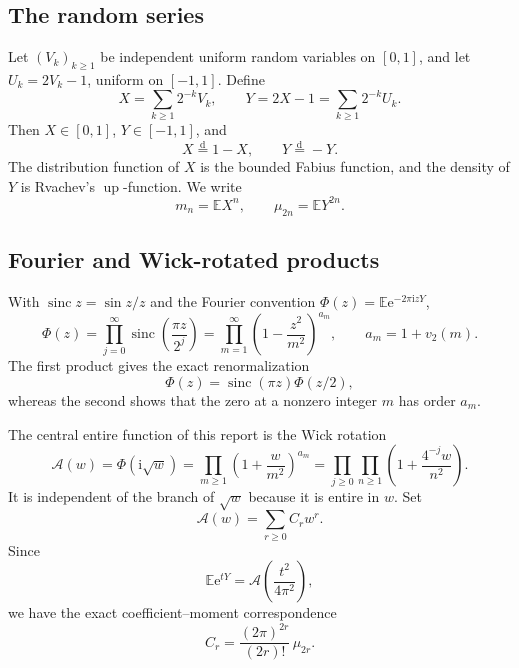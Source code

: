 \documentclass[11pt,oneside]{article}
\theoremstyle{definition}
\theoremstyle{remark}
\newcommand{\Up}{\operatorname{up}}
\newcommand{\sinc}{\operatorname{sinc}}
\newcommand{\e}{\mathrm e}
\newcommand{\ii}{\mathrm i}
\newcommand{\E}{\mathbb E}
\newcommand{\dist}{\mathrel{\stackrel{\mathrm d}=}}
\begin{document}
\subsection{The random series}

Let $(V_k)_{k\ge1}$ be independent uniform random variables on $[0,1]$, and let
$U_k=2V_k-1$, uniform on $[-1,1]$.  Define
\begin{equation}\label{eq:X-Y-def}
 X=\sum_{k\ge1}2^{-k}V_k,\qquad
 Y=2X-1=\sum_{k\ge1}2^{-k}U_k.
\end{equation}
Then $X\in[0,1]$, $Y\in[-1,1]$, and
\begin{equation}\label{eq:symmetry}
 X\dist1-X,\qquad Y\dist-Y.
\end{equation}
The distribution function of $X$ is the bounded Fabius function, and the density
of $Y$ is Rvachev's $\Up$-function.  We write
\begin{equation}\label{eq:moments-def}
 m_n=\E X^n,\qquad \mu_{2n}=\E Y^{2n}.
\end{equation}

\subsection{Fourier and Wick-rotated products}

With $\sinc z=\sin z/z$ and the Fourier convention
$\Phi(z)=\E\e^{-2\pi\ii zY}$,
\begin{equation}\label{eq:Phi-products}
 \Phi(z)=\prod_{j=0}^{\infty}\sinc\!\left(\frac{\pi z}{2^j}\right)
 =\prod_{m=1}^{\infty}\left(1-\frac{z^2}{m^2}\right)^{a_m},
 \qquad a_m=1+v_2(m).
\end{equation}
The first product gives the exact renormalization
\begin{equation}\label{eq:Phi-renorm}
 \Phi(z)=\sinc(\pi z)\Phi(z/2),
\end{equation}
whereas the second shows that the zero at a nonzero integer $m$ has order
$a_m$.

The central entire function of this report is the Wick rotation
\begin{equation}\label{eq:A-def}
 \mathcal A(w)=\Phi(\ii\sqrt w)
 =\prod_{m\ge1}\left(1+\frac{w}{m^2}\right)^{a_m}
 =\prod_{j\ge0}\prod_{n\ge1}\left(1+\frac{4^{-j}w}{n^2}\right).
\end{equation}
It is independent of the branch of $\sqrt w$ because it is entire in $w$.
Set
\begin{equation}\label{eq:C-def}
 \mathcal A(w)=\sum_{r\ge0}C_rw^r.
\end{equation}
Since
\begin{equation}\label{eq:mgf-A}
 \E\e^{tY}=\mathcal A\!\left(\frac{t^2}{4\pi^2}\right),
\end{equation}
we have the exact coefficient--moment correspondence
\begin{equation}\label{eq:C-moment}
 C_r=\frac{(2\pi)^{2r}}{(2r)!}\,\mu_{2r}.
\end{equation}
\end{document}
